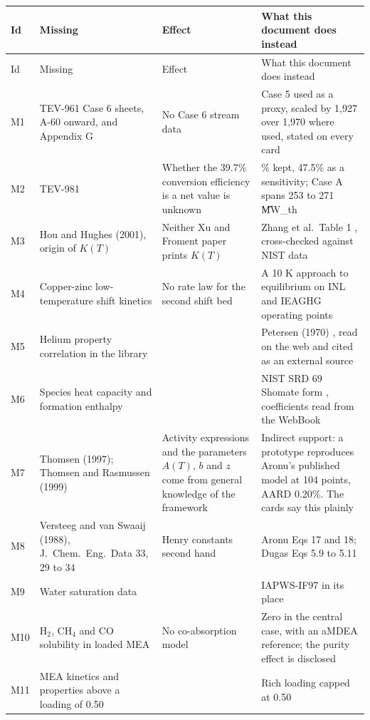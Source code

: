 \begingroup\small
\begin{longtable}{@{}>{\raggedright\arraybackslash}p{0.9cm}>{\raggedright\arraybackslash}p{3.9cm}>{\raggedright\arraybackslash}p{4.2cm}>{\raggedright\arraybackslash}p{6.6cm}@{}}
\toprule Id & Missing & Effect & What this document does instead\\\midrule\endfirsthead
\toprule Id & Missing & Effect & What this document does instead\\\midrule\endhead
\bottomrule\endlastfoot
M1 & TEV-961 Case 6 sheets, A-60 onward, and Appendix G & No Case 6 stream data & Case 5 used as a proxy, scaled by 1,927 over 1,970 where used, stated on every card\\
M2 & TEV-981 & Whether the 39.7\% conversion efficiency is a net value is unknown & 39.7\% kept, 47.5\% as a sensitivity; Case A spans 253 to 271 \U{MW_{th}}\\
M3 & Hou and Hughes (2001), origin of $K(T)$ & Neither Xu and Froment paper prints $K(T)$ & Zhang et al.\ Table 1 \cite{Zhang21}, cross-checked against NIST data\\
M4 & Copper-zinc low-temperature shift kinetics & No rate law for the second shift bed & A 10 K approach to equilibrium on INL and IEAGHG operating points\\
M5 & Helium property correlation in the library & & Petersen (1970) \cite{Petersen}, read on the web and cited as an external source\\
M6 & Species heat capacity and formation enthalpy & & NIST SRD 69 Shomate form \cite{NIST69}, coefficients read from the WebBook\\
M7 & Thomsen (1997); Thomsen and Rasmussen (1999) & Activity expressions and the parameters $A(T)$, $b$ and $z$ come from general knowledge of the framework & Indirect support: a prototype reproduces Aronu's published model at 104 points, AARD 0.20\%. The cards say this plainly\\
M8 & Versteeg and van Swaaij (1988), J.\ Chem.\ Eng.\ Data 33, 29 to 34 & Henry constants second hand & Aronu Eqs 17 and 18; Dugas Eqs 5.9 to 5.11 \cite{Dugas}\\
M9 & Water saturation data & & IAPWS-IF97 in its place\\
M10 & H$_2$, CH$_4$ and CO solubility in loaded MEA & No co-absorption model & Zero in the central case, with an aMDEA reference; the purity effect is disclosed\\
M11 & MEA kinetics and properties above a loading of 0.50 & & Rich loading capped at 0.50\\

\end{longtable}
